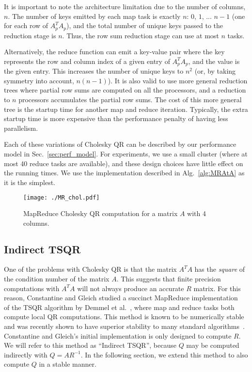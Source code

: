 \documentclass[10pt, conference, compsocconf]{IEEEtran}
\begin{document}
It is important to note the architecture limitation due to the number of columns, $n$.  The number of keys emitted by each map task is exactly $n$: $0$, $1$, ... $n-1$ (one for each row of $A_p^TA_p$), and the total number of unique keys passed to the reduction stage is $n$.  Thus, the row sum reduction stage can use at most $n$ tasks.

Alternatively, the reduce function can emit a key-value pair where the key represents the row and column index of a given entry of $A_p^TA_p$, and the value is the given entry.  This increases the number of unique keys to $n^2$ (or, by taking symmetry into account, $n(n-1)$).  It is also valid to use more general reduction trees where partial row sums are computed on all the processors, and a reduction to $n$ processors accumulates the partial row sums.  The cost of this more general tree is the startup time for another map and reduce iteration.  Typically, the extra startup time is more expensive than the performance penalty of having less parallelism.

Each of these variations of Cholesky QR can be described by our performance model in Sec.~\ref{sec:perf_model}.  For experiments, we use a small cluster (where at most 40 reduce tasks are available), and these design choices have little effect on the running times.  We use the implementation described in Alg.~\ref{alg:MRAtA} as it is the simplest.


\begin{figure*}
\centering
\texttt{[image: ./MR\_chol.pdf]}
\caption{MapReduce Cholesky QR computation for a matrix $A$ with 4 columns.}
\label{fig:MR_chol}
\end{figure*}



\subsection{Indirect TSQR}\label{sec:indir_tsqr}

One of the problems with Cholesky QR is that the matrix $A^T A$ has the \emph{square} of the condition number of the matrix $A$. This suggests that finite precision computations with $A^T A$ will not always produce an accurate $R$ matrix. For this reason, Constantine and Gleich studied a succinct MapReduce implementation~\cite{Constantine-2011-TSQR-MapReduce} of the TSQR algorithm by Demmel et al.~\cite{demmel-2008-caqr}, where map and reduce tasks both compute local QR computations.  This method is known to be numerically stable~\cite{demmel-2008-caqr} and was recently shown to have superior stability to many standard algorithms~\cite{Mori-2012-allreduce}.  Constantine and Gleich's initial implementation is only designed to compute $R$.  We will refer to this method as ``Indirect TSQR'', because $Q$ may be computed indirectly with $Q = AR^{-1}$.  In the following section, we extend this method to also compute $Q$ in a stable manner. 
\end{document}
